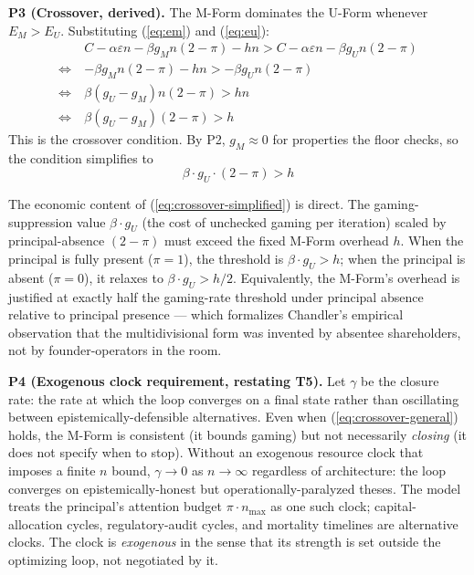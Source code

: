 \documentclass[11pt]{article}
\begin{document}
\textbf{P3 (Crossover, derived).} The M-Form dominates the U-Form whenever $E_M > E_U$. Substituting (\ref{eq:em}) and (\ref{eq:eu}):
\begin{align}
&C - \alpha \varepsilon n - \beta g_M n (2 - \pi) - h n  >  C - \alpha \varepsilon n - \beta g_U n (2 - \pi) \\
\Leftrightarrow~ &-\beta g_M n (2 - \pi) - h n  >  -\beta g_U n (2 - \pi) \\
\Leftrightarrow~ &\beta (g_U - g_M) n (2 - \pi)  >  h n \\
\Leftrightarrow~ &\beta (g_U - g_M)(2 - \pi)  >  h \label{eq:crossover-general}
\end{align}
This is the crossover condition. By P2, $g_M \approx 0$ for properties the floor checks, so the condition simplifies to
\begin{equation}
\beta \cdot g_U \cdot (2 - \pi)  >  h
\label{eq:crossover-simplified}
\end{equation}

The economic content of (\ref{eq:crossover-simplified}) is direct. The gaming-suppression value $\beta \cdot g_U$ (the cost of unchecked gaming per iteration) scaled by principal-absence $(2 - \pi)$ must exceed the fixed M-Form overhead $h$. When the principal is fully present ($\pi = 1$), the threshold is $\beta \cdot g_U > h$; when the principal is absent ($\pi = 0$), it relaxes to $\beta \cdot g_U > h/2$. Equivalently, the M-Form's overhead is justified at exactly half the gaming-rate threshold under principal absence relative to principal presence --- which formalizes Chandler's empirical observation that the multidivisional form was invented by absentee shareholders, not by founder-operators in the room.

\textbf{P4 (Exogenous clock requirement, restating T5).} Let $\gamma$ be the closure rate: the rate at which the loop converges on a final state rather than oscillating between epistemically-defensible alternatives. Even when (\ref{eq:crossover-general}) holds, the M-Form is consistent (it bounds gaming) but not necessarily \emph{closing} (it does not specify when to stop). Without an exogenous resource clock that imposes a finite $n$ bound, $\gamma \to 0$ as $n \to \infty$ regardless of architecture: the loop converges on epistemically-honest but operationally-paralyzed theses. The model treats the principal's attention budget $\pi \cdot n_{\max}$ as one such clock; capital-allocation cycles, regulatory-audit cycles, and mortality timelines are alternative clocks. The clock is \emph{exogenous} in the sense that its strength is set outside the optimizing loop, not negotiated by it.
\end{document}
